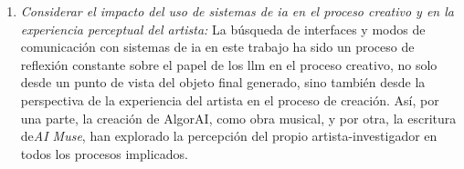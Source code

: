 \begin{enumerate}[label=\alph*)]
    \item \textit{Considerar el impacto del uso de sistemas de \gls{ia} en el proceso creativo y en la experiencia perceptual del artista:} La búsqueda de interfaces y modos de comunicación con sistemas de \gls{ia} en este trabajo ha sido un proceso de reflexión constante sobre el papel de los \gls{llm} en el proceso creativo, no solo desde un punto de vista del objeto final generado, sino también desde la perspectiva de la experiencia del artista en el proceso de creación. Así, por una parte, la creación de AlgorAI, como obra musical, y por otra, la escritura de\emph{AI Muse}, han explorado la percepción del propio artista-investigador en todos los procesos implicados.
\end{enumerate}
